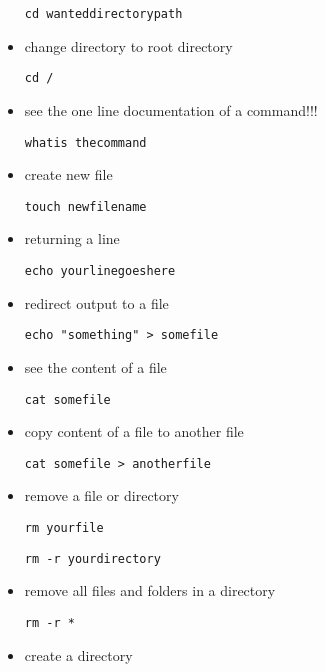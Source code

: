 \documentclass[
]{article}
\begin{document}
\begin{itemize}
\begin{verbatim}
cd wanteddirectorypath
\end{verbatim}
\item
  change directory to root directory

\begin{verbatim}
cd /
\end{verbatim}
\item
  see the one line documentation of a command!!!

\begin{verbatim}
whatis thecommand
\end{verbatim}
\item
  create new file

\begin{verbatim}
touch newfilename
\end{verbatim}
\item
  returning a line

\begin{verbatim}
echo yourlinegoeshere
\end{verbatim}
\item
  redirect output to a file

\begin{verbatim}
echo "something" > somefile
\end{verbatim}
\item
  see the content of a file

\begin{verbatim}
cat somefile
\end{verbatim}
\item
  copy content of a file to another file

\begin{verbatim}
cat somefile > anotherfile
\end{verbatim}
\item
  remove a file or directory

\begin{verbatim}
rm yourfile
\end{verbatim}

\begin{verbatim}
rm -r yourdirectory
\end{verbatim}
\item
  remove all files and folders in a directory

\begin{verbatim}
rm -r *
\end{verbatim}
\item
  create a directory


\end{itemize}
\end{document}
